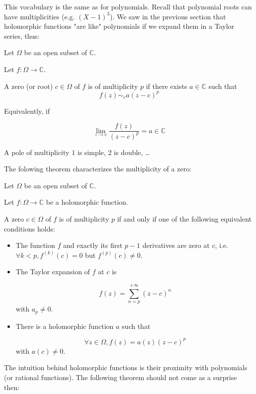 This vocabulary is the same as for polynomials. Recall that polynomial roots can have multiplicities (e.g. $(X-1)^3$). We saw in the previous section that holomorphic functions "are like" polynomials if we expand them in a Taylor series, thus:

\begin{defi}
    [Zero]
    Let $\Omega$ be an open subset of $\mathbb{C}$.

    Let $f: \Omega \rightarrow \mathbb{C}$.

    A zero (or root) $c\in\Omega$ of $f$ is of multiplicity $p$ if there exists $a\in\mathbb{C}$ such that
    $$ f(z) \sim_{c}a(z-c)^p $$
    
    Equivalently, if 

    $$\lim_{z\rightarrow c} \frac{f(z)}{(z-c)^p} =a \in\mathbb{C}$$

    A pole of multiplicity $ 1$ is simple, $2$ is double, \dots 
\end{defi}


The folowing theorem characterizes the multiplicity of a zero:
\begin{thm*}
    Let $\Omega$ be an open subset of $\mathbb{C}$.

    Let $f: \Omega \rightarrow \mathbb{C}$ be a holomorphic function.

    A zero $c\in\Omega$ of $f$ is of multiplicity $p$ if and only if one of the following equivalent conditions holds:

    \begin{itemize}
        \item The function $f$ and exactly its first $p-1$ derivatives are zero at $c$, i.e. $\forall k < p, f^{(k)}(c) = 0$ but $f^{(p)}(c) \neq 0$.

        \item The Taylor expansion of $f$ at $c$ is 

            $$ f(z) = \sum_{n=p}^{+\infty}(z-c)^n$$ with $a_p\neq 0$.

        \item There is a holomorphic function $a$ such that 

            $$ \forall z\in\Omega, f(z) = a(z) (z-c)^p$$
            with $a(c) \neq 0$.
    \end{itemize}


\end{thm*}

The intuition behind holomorphic functions is their proximity with polynomials (or rational functions). The following theorem should not come as a surprise then:

